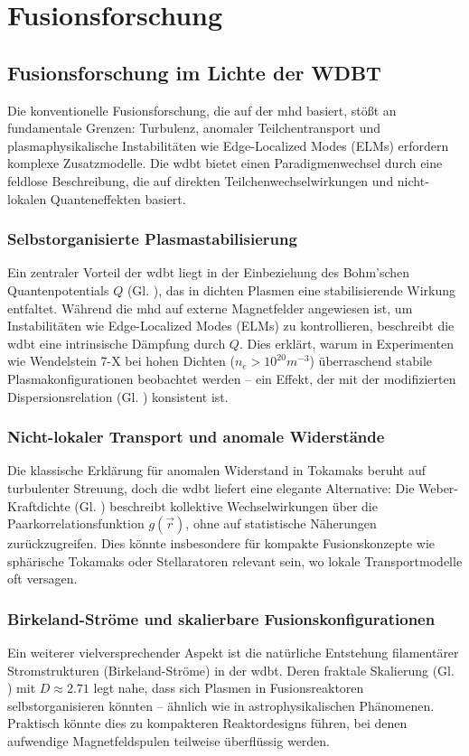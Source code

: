 \chapter{Fusionsforschung}
\section{Fusionsforschung im Lichte der WDBT}
Die konventionelle Fusionsforschung, die auf der \gls{mhd} basiert, stößt an fundamentale Grenzen: Turbulenz, anomaler Teilchentransport und plasmaphysikalische Instabilitäten wie
Edge-Localized Modes (ELMs) erfordern komplexe Zusatzmodelle. Die \gls{wdbt} bietet einen Paradigmenwechsel durch eine feldlose Beschreibung, die auf direkten Teilchenwechselwirkungen und nicht-lokalen
Quanteneffekten basiert.

\subsection{Selbstorganisierte Plasmastabilisierung}
Ein zentraler Vorteil der \gls{wdbt} liegt in der Einbeziehung des Bohm’schen Quantenpotentials $Q$ (Gl. ), das in dichten Plasmen eine stabilisierende Wirkung entfaltet.
Während die \gls{mhd} auf externe Magnetfelder angewiesen ist, um Instabilitäten wie Edge-Localized Modes (ELMs) zu kontrollieren, beschreibt die \gls{wdbt} eine intrinsische
Dämpfung durch $Q$. Dies erklärt, warum in Experimenten wie Wendelstein 7-X bei hohen Dichten ($n_e > 10^{20} m^{-3}$) überraschend stabile Plasmakonfigurationen beobachtet
werden – ein Effekt, der mit der modifizierten Dispersionsrelation (Gl. ) konsistent ist.

\subsection{Nicht-lokaler Transport und anomale Widerstände}
Die klassische Erklärung für anomalen Widerstand in Tokamaks beruht auf turbulenter Streuung, doch die \gls{wdbt} liefert eine elegante Alternative: Die Weber-Kraftdichte (Gl. )
beschreibt kollektive Wechselwirkungen über die Paarkorrelationsfunktion $g(\vec{r})$, ohne auf statistische Näherungen zurückzugreifen. Dies könnte insbesondere für kompakte
Fusionskonzepte wie sphärische Tokamaks oder Stellaratoren relevant sein, wo lokale Transportmodelle oft versagen.

\subsection{Birkeland-Ströme und skalierbare Fusionskonfigurationen}
Ein weiterer vielversprechender Aspekt ist die natürliche Entstehung filamentärer Stromstrukturen (Birkeland-Ströme) in der \gls{wdbt}. Deren fraktale Skalierung (Gl. ) mit
$D \approx 2.71$ legt nahe, dass sich Plasmen in Fusionsreaktoren selbstorganisieren könnten – ähnlich wie in astrophysikalischen Phänomenen. Praktisch könnte dies zu kompakteren
Reaktordesigns führen, bei denen aufwendige Magnetfeldspulen teilweise überflüssig werden.

